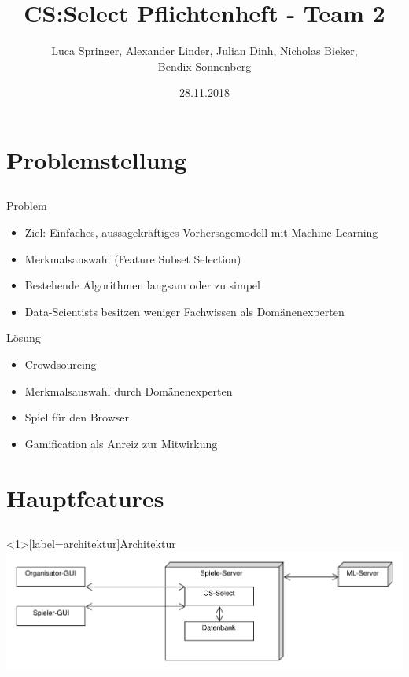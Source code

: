 \documentclass[xcolor=dvipsnames]{beamer}
\title[Team 2 - Pflichtenheft]{CS:Select Pflichtenheft - Team 2}
\author{Luca Springer, Alexander Linder, Julian Dinh, Nicholas Bieker,\\ Bendix Sonnenberg}
\date{28.11.2018}
\begin{document}
\begin{frame} %
  \titlepage
\end{frame}
\section{Problemstellung}
\subsection{}
\begin{frame}{Problem}
    \begin{itemize}
        \item Ziel: Einfaches, aussagekräftiges Vorhersagemodell mit Machine-Learning \\
        \item Merkmalsauswahl (Feature Subset Selection) \\
        \item Bestehende Algorithmen langsam oder zu simpel \\
        \item Data-Scientists besitzen weniger Fachwissen als Domänenexperten \\
    \end{itemize}
\end{frame}
\begin{frame}{Lösung}
    \begin{itemize}
        \item Crowdsourcing \\
        \item Merkmalsauswahl durch Domänenexperten \\
        \item Spiel für den Browser \\
        \item Gamification als Anreiz zur Mitwirkung \\
    \end{itemize}
\end{frame}
\section{Hauptfeatures}
\subsection{}
\begin{frame}<1>[label=architektur]{Architektur}
\center \includegraphics[scale=0.4]{img/Architektur.pdf}
\end{frame}
\end{document}
